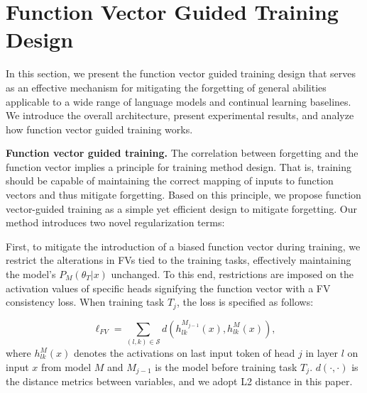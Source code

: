 
\section{Function Vector Guided Training Design}
\label{sec6}

In this section, we present the function vector guided training design that serves as an effective mechanism for mitigating the forgetting of general abilities applicable to a wide range of language models and continual learning baselines. We introduce the overall architecture, present experimental results, and analyze how function vector guided training works.

\textbf{Function vector guided training.}
The correlation between forgetting and the function vector implies a principle for training method design. That is, training should be capable of maintaining the correct mapping of inputs to function vectors and thus mitigate forgetting. Based on this principle, we propose function vector-guided training as a simple yet efficient design to mitigate forgetting. Our method introduces two novel regularization terms:


First, to mitigate the introduction of a biased function vector during training, we restrict the alterations in FVs tied to the training tasks, effectively maintaining the model's \(P_M(\theta_T|x)\) unchanged. To this end, restrictions are imposed on the activation values of specific heads signifying the function vector with a FV consistency loss. When training task $T_j$, the loss is specified as follows: 

\begin{equation}
\ell_{FV} = \sum_{(l,k)\in \mathcal{S}} d \left(h^{M_{j-1}}_{lk}(x), h^M_{lk}(x)\right),
\end{equation}
where $h^{M}_{lk}(x)$ denotes the activations on last input token of head $j$ in layer $l$ on input $x$ from model $M$ and $M_{j-1}$ is the model before training task $T_j$. $d(\cdot,\cdot)$ is the distance metrics between variables, and we adopt L2 distance in this paper.


